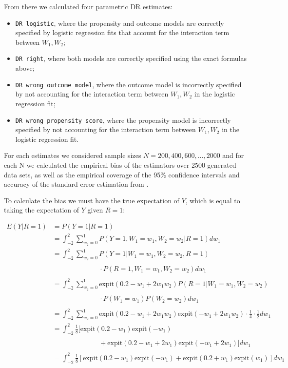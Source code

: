 \documentclass[12pt,twoside]{article}
\newcommand{\expit}{\text{expit}}
\begin{document}
From there we calculated four parametric DR estimates: 
\begin{itemize}
    \item \texttt{DR logistic}, where the propensity and outcome models are correctly specified by logistic regression fits that account for the interaction term between $W_1, W_2$;
    \item \texttt{DR right}, where both models are correctly specified using the exact formulas above;
    \item \texttt{DR wrong outcome model}, where the outcome model is incorrectly specified by not accounting for the interaction term between $W_1, W_2$ in the logistic regression fit;
    \item \texttt{DR wrong propensity score}, where the propensity model is incorrectly specified by not accounting for the interaction term between $W_1, W_2$ in the logistic regression fit.
\end{itemize}

For each estimates we considered sample sizes $N = 200, 400, 600, ..., 2000$ and for each N we calculated the empirical bias of the estimators over 2500 generated data sets, as well as the empirical coverage of the 95\% confidence intervals and accuracy of the standard error estimation from \citet{lunceford_davidian}.

To calculate the bias we must have the true expectation of $Y$, which is equal to taking the expectation of $Y$ given $R = 1$:

\begin{align*}
    E(Y|R = 1) &= P(Y = 1|R = 1)\\
    &= \int_{-2}^{2} \sum_{w_2 = 0}^{1} P(Y = 1, W_1 = w_1, W_2 = w_2|R = 1) dw_1 \\
    & = \int_{-2}^{2} \sum_{w_2 = 0}^{1} P(Y = 1|W_1 = w_1, W_2 = w_2, R = 1) \\
    & \phantom{ = \int_{-2}^{2} \sum_{w_2 = 0}^{1}} \cdot P(R = 1, W_1 = w_1, W_2 = w_2)dw_1 \\
    & = \int_{-2}^{2} \sum_{w_2 = 0}^{1} \expit(0.2 - w_1 + 2w_1w_2)P(R = 1|W_1 = w_1, W_2 = w_2) \\
    &\phantom{ = \int_{-2}^{2} \sum_{w_2 = 0}^{1}} \cdot P(W_1 = w_1)P(W_2 = w_2)dw_1 \\
    & = \int_{-2}^{2} \sum_{w_2 = 0}^{1} \expit(0.2 - w_1 + 2w_1w_2)\expit(-w_1+2w_1w_2) \cdot \frac{1}{4}\cdot \frac{1}{2}dw_1 \\
    & = \int_{-2}^{2} \frac{1}{8}[\expit(0.2 - w_1)\expit(-w_1) \\
    &\phantom{ = \int_{-2}^{2} \sum_{w_2 = 0}^{1}} +\expit(0.2 - w_1 + 2w_1)\expit(-w_1+2w_1)]dw_1 \\
    & = \int_{-2}^{2} \frac{1}{8}[\expit(0.2 - w_1)\expit(-w_1) +\expit(0.2 + w_1)\expit(w_1)]dw_1 \\
\end{align*}
\end{document}
